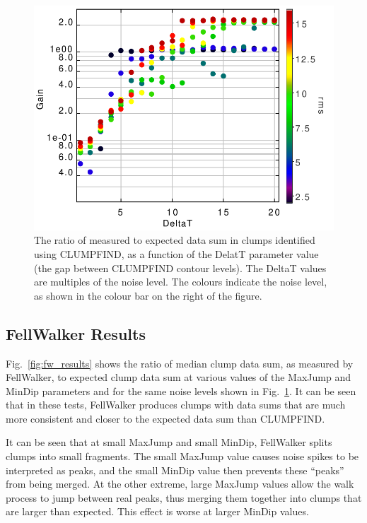\documentclass[final,authoryear,5p,times,twocolumn]{elsarticle}
\begin{document}
\begin{figure}
\includegraphics[width=\columnwidth]{comp4_cf}
\caption{The ratio of measured to expected data sum in clumps identified
using CLUMPFIND, as a function of the DelatT parameter value (the gap
between CLUMPFIND contour levels). The DeltaT values are multiples of the
noise level. The colours indicate the noise level, as shown in the colour
bar on the right of the figure.}
\label{fig:cf_results}
\end{figure}

\subsection{FellWalker Results}
Fig.~\ref{fig:fw_results} shows the ratio of median clump data sum, as
measured by FellWalker, to expected clump data sum at various values of
the MaxJump and MinDip parameters and for the same noise levels shown in
Fig.~\ref{fig:cf_results}. It can be seen that in these tests, FellWalker
produces clumps with data sums that are much more consistent and closer
to the expected data sum than CLUMPFIND.

It can be seen that at small MaxJump and small MinDip, FellWalker splits
clumps into small fragments. The small MaxJump value causes noise spikes
to be interpreted as peaks, and the small MinDip value then prevents these
``peaks'' from being merged. At the other extreme, large MaxJump values
allow the walk process to jump between real peaks, thus merging them
together into clumps that are larger than expected. This effect is worse
at larger MinDip values.
\end{document}
